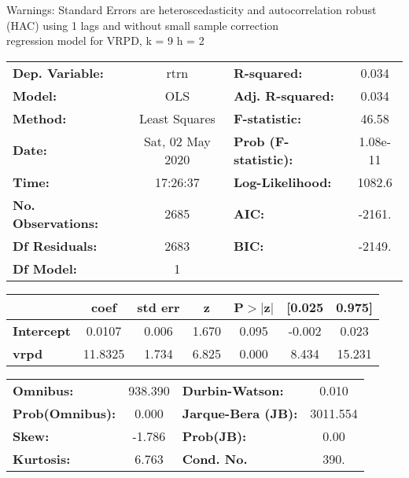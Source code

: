 Warnings: \newline
 [1] Standard Errors are heteroscedasticity and autocorrelation robust (HAC) using 1 lags and without small sample correction\\ 

regression model for VRPD, k = 9 h = 2\begin{center}
\begin{tabular}{lclc}
\toprule
\textbf{Dep. Variable:}    &       rtrn       & \textbf{  R-squared:         } &     0.034   \\
\textbf{Model:}            &       OLS        & \textbf{  Adj. R-squared:    } &     0.034   \\
\textbf{Method:}           &  Least Squares   & \textbf{  F-statistic:       } &     46.58   \\
\textbf{Date:}             & Sat, 02 May 2020 & \textbf{  Prob (F-statistic):} &  1.08e-11   \\
\textbf{Time:}             &     17:26:37     & \textbf{  Log-Likelihood:    } &    1082.6   \\
\textbf{No. Observations:} &        2685      & \textbf{  AIC:               } &    -2161.   \\
\textbf{Df Residuals:}     &        2683      & \textbf{  BIC:               } &    -2149.   \\
\textbf{Df Model:}         &           1      & \textbf{                     } &             \\
\bottomrule
\end{tabular}
\begin{tabular}{lcccccc}
                   & \textbf{coef} & \textbf{std err} & \textbf{z} & \textbf{P$> |$z$|$} & \textbf{[0.025} & \textbf{0.975]}  \\
\midrule
\textbf{Intercept} &       0.0107  &        0.006     &     1.670  &         0.095        &       -0.002    &        0.023     \\
\textbf{vrpd}      &      11.8325  &        1.734     &     6.825  &         0.000        &        8.434    &       15.231     \\
\bottomrule
\end{tabular}
\begin{tabular}{lclc}
\textbf{Omnibus:}       & 938.390 & \textbf{  Durbin-Watson:     } &    0.010  \\
\textbf{Prob(Omnibus):} &   0.000 & \textbf{  Jarque-Bera (JB):  } & 3011.554  \\
\textbf{Skew:}          &  -1.786 & \textbf{  Prob(JB):          } &     0.00  \\
\textbf{Kurtosis:}      &   6.763 & \textbf{  Cond. No.          } &     390.  \\
\bottomrule
\end{tabular}
\end{center}

